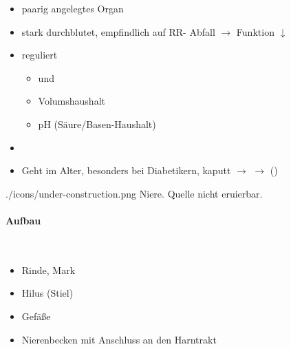 {
\begin{itemize}
    \item paarig angelegtes Organ
    \item stark durchblutet, empfindlich auf RR- Abfall ${\rightarrow}$
    Funktion ${\downarrow}$
    \item reguliert
    \begin{itemize}
        \item {} und
        \item Volumshaushalt
        \item pH
        (Säure/Basen-Haushalt)
    \end{itemize}
    \item {}
    \item Geht im Alter, besonders bei Diabetikern, kaputt ${\rightarrow}$
    {\quotedblbase} ${\rightarrow}$
    {\quotedblbase}
    ()
\end{itemize}


}{}
{./icons/under-construction.png}
{Niere.}
{Quelle nicht eruierbar.}




\paragraph{Aufbau}~

\begin{itemize}
\item Rinde, Mark
\item Hilus (Stiel)
\item Gefäße
\item Nierenbecken mit Anschluss an den
Harntrakt
\end{itemize}



\paragraph{}

